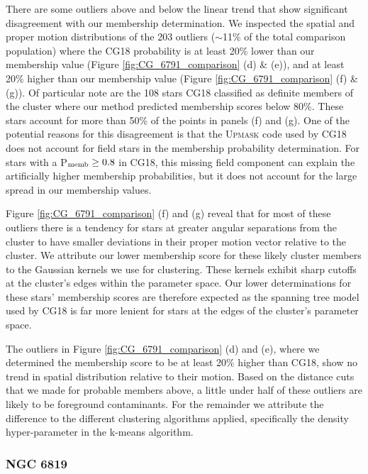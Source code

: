 There are some outliers above and below the linear trend that show significant disagreement with our membership determination. We inspected the spatial and proper motion distributions of the 203 outliers ($\sim$11\% of the total comparison population) where the CG18 probability is at least 20\% lower than our membership value (Figure \ref{fig:CG_6791_comparison} (d) \& (e)), and at least 20\% higher than our membership value (Figure \ref{fig:CG_6791_comparison} (f) \& (g)). Of particular note are the 108 stars CG18 classified as definite members of the cluster where our method predicted membership scores below 80\%. These stars account for more than 50\% of the points in panels (f) and (g). One of the potential reasons for this disagreement is that the \textsc{Upmask} code used by CG18 does not account for field stars in the membership probability determination. For stars with a P$_{\rm memb} \geq 0.8$ in CG18, this missing field component can explain the artificially higher membership probabilities, but it does not account for the large spread in our membership values.

Figure \ref{fig:CG_6791_comparison} (f) and (g) reveal that for most of these outliers there is a tendency for stars at greater angular separations from the cluster to have smaller deviations in their proper motion vector relative to the cluster. We attribute our lower membership score for these likely cluster members to the Gaussian kernels we use for clustering. These kernels exhibit sharp cutoffs at the cluster's edges within the parameter space. Our lower determinations for these stars' membership scores are therefore expected as the spanning tree model used by CG18 is far more lenient for stars at the edges of the cluster's parameter space.

The outliers in Figure \ref{fig:CG_6791_comparison} (d) and (e), where we determined the membership score to be at least 20\% higher than CG18, show no trend in spatial distribution relative to their motion. Based on the \cite{bailer-jones_estimating_2018} distance cuts that we made for probable members above, a little under half of these outliers are likely to be foreground contaminants. For the remainder we attribute the difference to the different clustering algorithms applied, specifically the density hyper-parameter in the k-means algorithm.

\subsubsection{NGC 6819}


